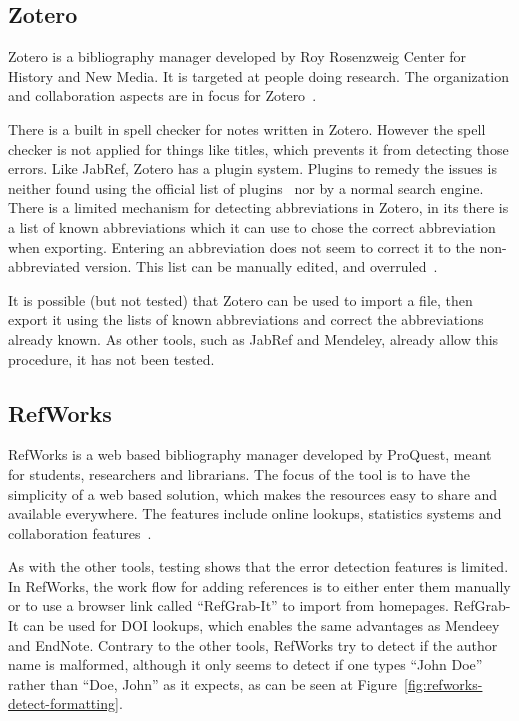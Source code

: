 \subsection{Zotero}

Zotero is a bibliography manager developed by Roy Rosenzweig Center
for History and New Media.  It is targeted at people doing research.
The organization and collaboration aspects are in focus for
Zotero~\cite{zotero_features}.

There is a built in spell checker for notes written in Zotero.
However the spell checker is not applied for things like titles, which
prevents it from detecting those errors.  Like JabRef, Zotero has a
plugin system.  Plugins to remedy the {\bibtex} issues is neither
found using the official list of plugins~\cite{zotero_plugins} nor by
a normal search engine. There is a limited mechanism for detecting
abbreviations in Zotero, in its  there is a list of known
abbreviations which it can use to chose the correct abbreviation when
exporting.  Entering an abbreviation does not seem to correct it to
the non-abbreviated version.  This list can be manually edited, and
overruled~\cite{zotero_abbreviations}.

It is possible (but not tested) that Zotero can be used to import a
{\bibtex} file, then export it using the lists of known abbreviations
and correct the abbreviations already known.  As other tools, such as
JabRef and Mendeley, already allow this procedure, it has not been
tested.


\subsection{RefWorks}
RefWorks is a web based bibliography manager developed by ProQuest,
meant for students, researchers and librarians.  The focus of the tool
is to have the simplicity of a web based solution, which makes the
resources easy to share and available everywhere.  The features
include online lookups, statistics systems and collaboration
features~\cite{refworks_features}.

As with the other tools, testing shows that the error detection
features is limited.  In RefWorks, the work flow for adding references
is to either enter them manually or to use a browser link called
``RefGrab-It'' to import from homepages.  RefGrab-It can be used for
DOI lookups, which enables the same advantages as Mendeey and EndNote.
Contrary to the other tools, RefWorks try to detect if the author name
is malformed, although it only seems to detect if one types ``John
Doe'' rather than ``Doe, John'' as it expects, as can be seen at
Figure~\ref{fig:refworks-detect-formatting}.

